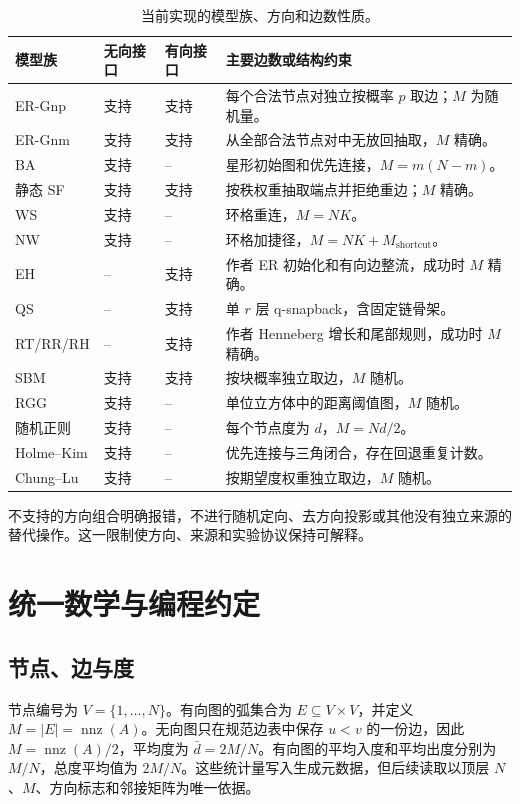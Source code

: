 \documentclass[UTF8,a4paper,11pt]{ctexart}
\begin{document}
\begin{table}[htbp]
\centering
\caption{当前实现的模型族、方向和边数性质。}
\label{tab:families}
\small
\begin{tabular}{p{3.0cm}p{2.4cm}p{2.4cm}p{6.2cm}}
\toprule
模型族 & 无向接口 & 有向接口 & 主要边数或结构约束 \\
\midrule
ER-Gnp & 支持 & 支持 & 每个合法节点对独立按概率 $p$ 取边；$M$ 为随机量。\\
ER-Gnm & 支持 & 支持 & 从全部合法节点对中无放回抽取，$M$ 精确。\\
BA & 支持 & -- & 星形初始图和优先连接，$M=m(N-m)$。\\
静态 SF & 支持 & 支持 & 按秩权重抽取端点并拒绝重边；$M$ 精确。\\
WS & 支持 & -- & 环格重连，$M=NK$。\\
NW & 支持 & -- & 环格加捷径，$M=NK+M_{\mathrm{shortcut}}$。\\
EH & -- & 支持 & 作者 ER 初始化和有向边整流，成功时 $M$ 精确。\\
QS & -- & 支持 & 单 $r$ 层 q-snapback，含固定链骨架。\\
RT/RR/RH & -- & 支持 & 作者 Henneberg 增长和尾部规则，成功时 $M$ 精确。\\
SBM & 支持 & 支持 & 按块概率独立取边，$M$ 随机。\\
RGG & 支持 & -- & 单位立方体中的距离阈值图，$M$ 随机。\\
随机正则 & 支持 & -- & 每个节点度为 $d$，$M=Nd/2$。\\
Holme--Kim & 支持 & -- & 优先连接与三角闭合，存在回退重复计数。\\
Chung--Lu & 支持 & -- & 按期望度权重独立取边，$M$ 随机。\\
\bottomrule
\end{tabular}
\end{table}

不支持的方向组合明确报错，不进行随机定向、去方向投影或其他没有独立来源的替代操作。这一限制使方向、来源和实验协议保持可解释。

\section{统一数学与编程约定}
\subsection{节点、边与度}
节点编号为 $V=\{1,\ldots,N\}$。有向图的弧集合为 $E\subseteq V\times V$，并定义 $M=|E|=\operatorname{nnz}(A)$。无向图只在规范边表中保存 $u<v$ 的一份边，因此 $M=\operatorname{nnz}(A)/2$，平均度为 $\bar d=2M/N$。有向图的平均入度和平均出度分别为 $M/N$，总度平均值为 $2M/N$。这些统计量写入生成元数据，但后续读取以顶层 $N$、$M$、方向标志和邻接矩阵为唯一依据。
\end{document}
